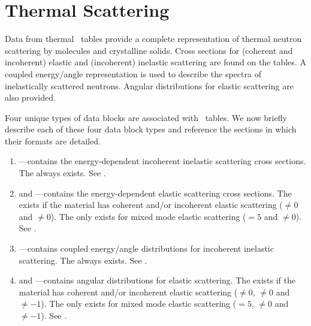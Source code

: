 \section[Thermal Scattering]{Thermal Scattering \SaB}\label{sec:ThermalScattering}

Data from thermal \SaB\ tables provide a complete representation of thermal neutron scattering by molecules
and crystalline solids. Cross sections for (coherent and incoherent) elastic and (incoherent) inelastic
scattering are found on the tables. A coupled energy/angle representation is used to describe the spectra
of inelastically scattered neutrons. Angular distributions for elastic scattering are also provided.

Four unique types of data blocks are associated with \SaB\ tables. We now briefly describe each of these four data
block types and reference the sections in which their formats are detailed.

\begin{enumerate}
  \item \textbf{}---contains the energy-dependent incoherent inelastic scattering cross sections.
                                The   always exists. See .
  \item \textbf{} and \textbf{}---contains the energy-dependent elastic scattering cross sections.
                                The  exists if the material has coherent and/or incoherent elastic scattering
                                ($\neq0$ and $\neq0$). The  only exists for mixed mode elastic scattering
                                ($=5$ and $\neq0$). See .
  \item \textbf{}---contains coupled energy/angle distributions for incoherent inelastic scattering.
                                The  always exists. See .
  \item \textbf{} and \textbf{}---contains angular distributions for elastic scattering.
                                The  exists if the material has coherent and/or incoherent elastic scattering
                                ($\neq0$, $\neq0$ and $\neq-1$). The  only exists for mixed mode
                                elastic scattering ($=5$, $\neq0$ and $\neq-1$). See .
\end{enumerate}


